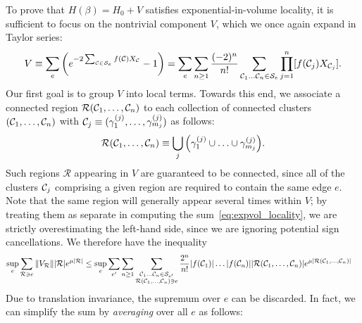 To prove that $H(\beta) = H_0 + V$ satisfies exponential-in-volume locality, it is sufficient to focus on the nontrivial component $V$, which we once again expand in Taylor series:
\begin{equation}
    V \equiv \sum_e \qty( e^{-2 \sum_{\mathcal{C} \in \mathcal{S}_e} f(\mathcal{C}) X_{\mathcal{C}}} - 1 ) = \sum_e \sum_{n \geq 1} \frac{(-2)^n}{n!} \sum_{\mathcal{C}_1 \ldots \mathcal{C}_n \in \mathcal{S}_e} \prod_{j = 1}^n [f(\mathcal{C}_j) X_{\mathcal{C}_j}] .
\end{equation}
Our first goal is to group $V$ into local terms. Towards this end, we associate a connected region $\mathcal{R}(\mathcal{C}_1 , \ldots , \mathcal{C}_n)$ to each collection of connected clusters $(\mathcal{C}_1, \ldots , \mathcal{C}_n)$ with $\mathcal{C}_j \equiv (\gamma^{(j)}_1 , \ldots , \gamma^{(j)}_{m_j})$ as follows:
\begin{equation}
    \mathcal{R}(\mathcal{C}_1 , \ldots , \mathcal{C}_n) \equiv \bigcup_{j} \qty(  \gamma^{(j)}_1 \cup \ldots \cup \gamma^{(j)}_{m_j} ) .
\end{equation}
Such regions $\mathcal{R}$ appearing in $V$ are guaranteed to be connected, since all of the clusters $\mathcal{C}_j$ comprising a given region are required to contain the same edge $e$. Note that the same region will generally appear several times within $V$; by treating them as separate in computing the sum~\eqref{eq:expvol_locality}, we are strictly overestimating the left-hand side, since we are ignoring potential sign cancellations. We therefore have the inequality
\begin{equation}
    \begin{split}
        \sup_e \sum_{\mathcal{R} \ni e} \norm{V_{\mathcal{R}}} |\mathcal{R}| e^{\mu |\mathcal{R}|} &\leq \sup_e \sum_{e'} \sum_{n \geq 1} \sum_{\substack{\mathcal{C}_1 \ldots \mathcal{C}_n \in \mathcal{S}_{e'} \\ \mathcal{R}(\mathcal{C}_1 , \ldots , \mathcal{C}_n) \ni e}} \frac{2^n}{n!} \abs{f(\mathcal{C}_1)} \ldots \abs{f(\mathcal{C}_n)} \abs{\mathcal{R}(\mathcal{C}_1 , \ldots , \mathcal{C}_n)} e^{\mu \abs{\mathcal{R}(\mathcal{C}_1 , \ldots , \mathcal{C}_n)}} 
    \end{split}
\end{equation}
Due to translation invariance, the supremum over $e$ can be discarded. In fact, we can simplify the sum by \emph{averaging} over all $e$ as follows:

